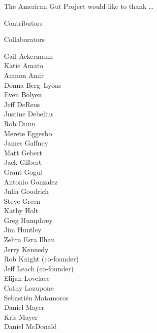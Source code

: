 \documentclass[10pt,letterpaper]{article}
\begin{document}
\newpage

\parbox{\textwidth}{
	\LARGE
	The American Gut Project would like to thank \ldots{}
}

\colorbox{agpGray}{\parbox{0.36\textwidth}{\vspace{1mm} \large \centering Contributors \vspace{1mm}}}
\hspace{1mm}
\colorbox{agpGray}{\parbox{0.623\textwidth}{\vspace{1mm} \large \centering Collaborators \vspace{1mm}}}

\parbox[t]{0.17\textwidth}{
\scriptsize{
Gail Ackermann\\
Katie Amato\\
Amnon Amir\\
Donna Berg--Lyons\\
Even Bolyen\\
Jeff DeReus\\
Justine Debelius\\
Rob Dunn\\
Merete Eggesbo\\
James Gaffney\\
Matt Gebert\\
Jack Gilbert\\
Grant Gogul\\
Antonio Gonzalez\\
Julia Goodrich\\
Steve Green\\
Kathy Holt\\
Greg Humphrey\\
Jim Huntley\\
Zehra Esra Ilhan\\
Jerry Kennedy\\
Rob Knight (co-founder)\\
Jeff Leach (co-founder)\\
Elijah Lovelace\\
Cathy Lozupone\\
Sebasti\'en Matamoros\\
Daniel Mayer\\
Kris Mayer\\
Daniel McDonald\\
}
}
\hspace{1mm}
\end{document}
